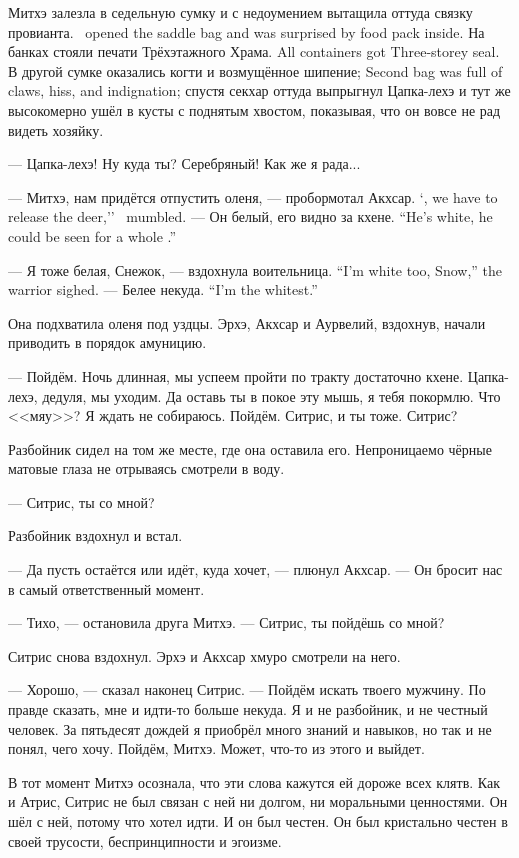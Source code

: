 {Митхэ залезла в седельную сумку и с недоумением вытащила оттуда связку провианта.}
{\Mitchoe\ opened the saddle bag and was surprised by food pack inside.}
{На банках стояли печати Трёхэтажного Храма.}
{All containers got Three-storey seal.}
{В другой сумке оказались когти и возмущённое шипение;}
{Second bag was full of claws, hiss, and indignation;}
спустя секхар оттуда выпрыгнул Цапка-лехэ и тут же высокомерно ушёл в кусты с поднятым хвостом, показывая, что он вовсе не рад видеть хозяйку.

--- Цапка-лехэ!
Ну куда ты?
Серебряный!
Как же я рада...

{--- Митхэ, нам придётся отпустить оленя, --- пробормотал Акхсар.}
{`\Mitchoe, we have to release the deer,'' \Akchsar\ mumbled.}
{--- Он белый, его видно за кхене.}
{``He's white, he could be seen for a whole \kchenoel.''}

{--- Я тоже белая, Снежок, --- вздохнула воительница.}
{``I'm white too, Snow,'' the warrior sighed.}
{--- Белее некуда.}
{``I'm the whitest.''}

Она подхватила оленя под уздцы.
Эрхэ, Акхсар и Аурвелий, вздохнув, начали приводить в порядок амуницию.

--- Пойдём.
Ночь длинная, мы успеем пройти по тракту достаточно кхене.
Цапка-лехэ, дедуля, мы уходим.
Да оставь ты в покое эту мышь, я тебя покормлю.
Что <<мяу>>?
Я ждать не собираюсь.
Пойдём.
Ситрис, и ты тоже.
Ситрис?

Разбойник сидел на том же месте, где она оставила его.
Непроницаемо чёрные матовые глаза не отрываясь смотрели в воду.

--- Ситрис, ты со мной?

Разбойник вздохнул и встал.

--- Да пусть остаётся или идёт, куда хочет, --- плюнул Акхсар.
--- Он бросит нас в самый ответственный момент.

--- Тихо, --- остановила друга Митхэ.
--- Ситрис, ты пойдёшь со мной?

Ситрис снова вздохнул.
Эрхэ и Акхсар хмуро смотрели на него.

--- Хорошо, --- сказал наконец Ситрис.
--- Пойдём искать твоего мужчину.
По правде сказать, мне и идти-то больше некуда.
Я и не разбойник, и не честный человек.
За пятьдесят дождей я приобрёл много знаний и навыков, но так и не понял, чего хочу.
Пойдём, Митхэ.
Может, что-то из этого и выйдет.

В тот момент Митхэ осознала, что эти слова кажутся ей дороже всех клятв.
Как и Атрис, Ситрис не был связан с ней ни долгом, ни моральными ценностями.
Он шёл с ней, потому что хотел идти.
И он был честен.
Он был кристально честен в своей трусости, беспринципности и эгоизме.

